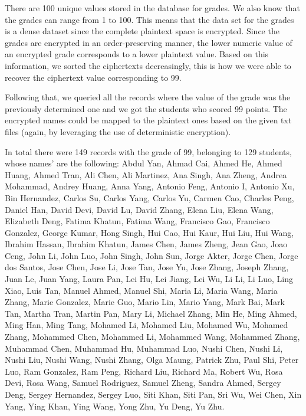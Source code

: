 There are 100 unique values stored in the database for grades. We also know that the grades can range from 1 to 100. This means that the data set for the grades is a dense dataset since the complete plaintext space is encrypted. Since the grades are encrypted in an order-preserving manner, the lower numeric value of an encrypted grade corresponds to a lower plaintext value. Based on this information, we sorted the ciphertexts decreasingly, this is how we were able to recover the ciphertext value corresponding to 99.

Following that, we queried all the records where the value of the grade was the previously determined one and we got the students who scored 99 points. The encrypted names could be mapped to the plaintext ones based on the given txt files (again, by leveraging the use of deterministic encryption).

In total there were 149 records with the grade of 99, belonging to 129 students, whose names' are the following: Abdul Yan, Ahmad Cai, Ahmed He, Ahmed Huang, Ahmed Tran, Ali Chen, Ali Martinez, Ana Singh, Ana Zheng, Andrea Mohammad, Andrey Huang, Anna Yang, Antonio Feng, Antonio I, Antonio Xu, Bin Hernandez, Carlos Su, Carlos Yang, Carlos Yu, Carmen Cao, Charles Peng, Daniel Han, David Devi, David Lu, David Zhang, Elena Liu, Elena Wang, Elizabeth Deng, Fatima Khatun, Fatima Wang, Francisco Gao, Francisco Gonzalez, George Kumar, Hong Singh, Hui Cao, Hui Kaur, Hui Liu, Hui Wang, Ibrahim Hassan, Ibrahim Khatun, James Chen, James Zheng, Jean Gao, Joao Ceng, John Li, John Luo, John Singh, John Sun, Jorge Akter, Jorge Chen, Jorge dos Santos, Jose Chen, Jose Li, Jose Tan, Jose Yu, Jose Zhang, Joseph Zhang, Juan Le, Juan Yang, Laura Pan, Lei Hu, Lei Jiang, Lei Wu, Li Li, Li Luo, Ling Xiao, Luis Tan, Manuel Ahmed, Manuel Shi, Maria Li, Maria Wang, Maria Zhang, Marie Gonzalez, Marie Guo, Mario Lin, Mario Yang, Mark Bai, Mark Tan, Martha Tran, Martin Pan, Mary Li, Michael Zhang, Min He, Ming Ahmed, Ming Han, Ming Tang, Mohamed Li, Mohamed Liu, Mohamed Wu, Mohamed Zhang, Mohammed Chen, Mohammed Li, Mohammed Wang, Mohammed Zhang, Muhammad Chen, Muhammad Hu, Muhammad Luo, Nushi Chen, Nushi Li, Nushi Liu, Nushi Wang, Nushi Zhang, Olga Maung, Patrick Zhu, Paul Shi, Peter Luo, Ram Gonzalez, Ram Peng, Richard Liu, Richard Ma, Robert Wu, Rosa Devi, Rosa Wang, Samuel Rodriguez, Samuel Zheng, Sandra Ahmed, Sergey Deng, Sergey Hernandez, Sergey Luo, Siti Khan, Siti Pan, Sri Wu, Wei Chen, Xin Yang, Ying Khan, Ying Wang, Yong Zhu, Yu Deng, Yu Zhu.

